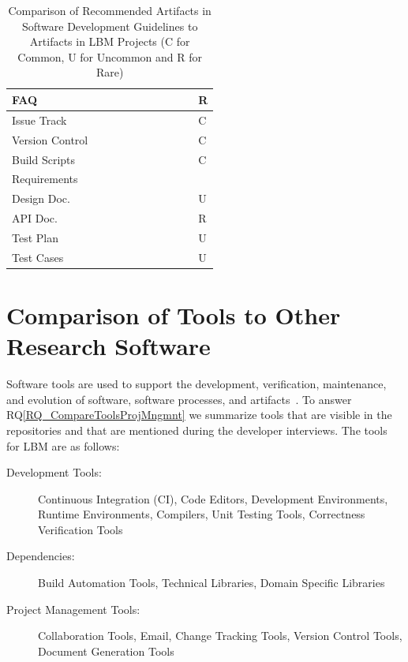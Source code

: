 \documentclass[runningheads]{llncs}
\newcommand{\rqref}[1]{RQ\ref{#1}}
\begin{document}
\begin{table}[!h]
\begin{center}
\begin{tabular}{ p{2.5cm}p{0.9cm}p{0.9cm}p{0.8cm}p{0.9cm}p{0.9cm}p{0.8cm}p{0.8cm}p{0.8cm}p{0.8cm}p{0.8cm} }
	FAQ &  &  &  &  & & & \checkmark & \checkmark & \checkmark & R\\
	\midrule
	Issue Track &  & \checkmark & \checkmark & & \checkmark & \checkmark & \checkmark & & \checkmark & C\\
	Version Control &  & \checkmark & \checkmark & \checkmark & \checkmark & \checkmark & \checkmark & \checkmark & \checkmark & C\\ 
	Build Scripts &  & \checkmark &  & \checkmark & \checkmark & \checkmark &
	\checkmark & & \checkmark & C\\
	\midrule
	Requirements &  & \checkmark &  &  & & \checkmark &  &  & \checkmark &  \\
	Design Doc.\ &  & \checkmark  & \checkmark &  & \checkmark & & \checkmark &
	\checkmark& \checkmark & U\\
	API Doc. &  &  &  &  & \checkmark & & \checkmark & \checkmark & \checkmark & R\\
	Test Plan &  & \checkmark &  &  & & \checkmark & & & &  U\\
	Test Cases & \checkmark & \checkmark & \checkmark &  & \checkmark & \checkmark &
	\checkmark & \checkmark & \checkmark & U\\
	\midrule
	\end{tabular}
	\caption{Comparison of Recommended Artifacts in Software Development Guidelines
	to Artifacts in LBM Projects (C for Common, U for Uncommon and R for Rare)}
	\label{Tbl_Guidelines}
	\end{center}
	\end{table}
	
\section{Comparison of Tools to Other Research Software}
\label{Sec_CompareTools}

Software tools are used to support the development, verification, maintenance,
and evolution of software, software processes, and artifacts~\cite[p.\
501]{GhezziEtAl2003}. To answer \rqref{RQ_CompareToolsProjMngmnt} we summarize
tools that are visible in the repositories and that are mentioned during the
developer interviews.  The tools for LBM are as follows:

\begin{description}
	\item[Development Tools:] Continuous Integration (CI), Code Editors,
	Development Environments, Runtime Environments, Compilers, Unit Testing
	Tools, Correctness Verification Tools
	\item[Dependencies:] Build Automation Tools, Technical Libraries, Domain
	Specific Libraries
	\item[Project Management Tools:] Collaboration Tools, Email, Change Tracking
	Tools, Version Control Tools, Document Generation Tools
\end{description}
\end{document}
